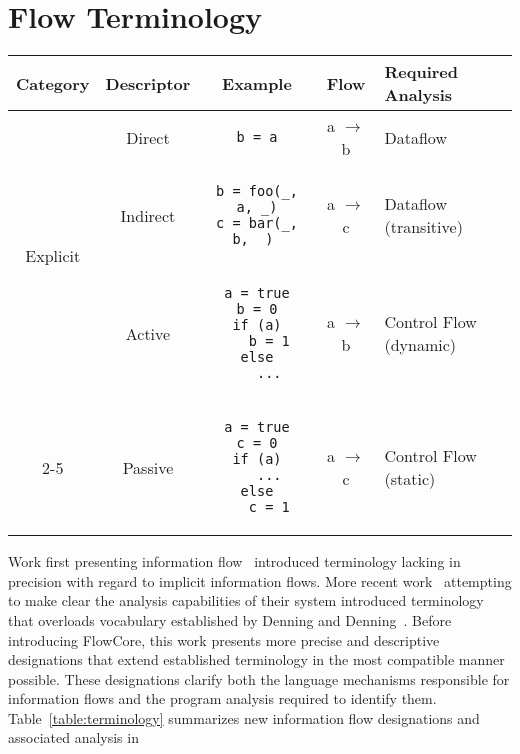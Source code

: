 \chapter{Flow Terminology}

\label{sec:terminology}

\begin{table*}
\centering
\begin{tabular}{ccccm{2.5cm}}
\toprule
Category & Descriptor & Example & Flow & Required Analysis \\
\midrule[\heavyrulewidth]
\multirow{3}{*}{Explicit} & Direct & 
\begin{lstlisting}
b = a
\end{lstlisting} & a $\rightarrow$ b & Dataflow\\
\cmidrule(r){2-5} & Indirect &
\begin{lstlisting}
b = foo(_, a, _)
c = bar(_, b, _) 
\end{lstlisting}
& a $\rightarrow$ c & Dataflow (transitive) \\
\hline
\multirow{7}{*}{Implicit} & Active & 
\begin{lstlisting}
a = true
b = 0
if (a)
   b = 1
else
   ...
\end{lstlisting}
& a $\rightarrow$ b & Control Flow (dynamic)\\
\cmidrule(r){2-5} & Passive & 
\begin{lstlisting}
a = true
c = 0
if (a)
   ...
else
   c = 1
\end{lstlisting}
& a $\rightarrow$ c & Control Flow (static)\\
\bottomrule
\end{tabular}
\caption{Terminology of Information Flows.}
\label{table:terminology}
\end{table*}

Work first presenting information flow~\cite{denning-cert} introduced terminology lacking in precision with regard  to implicit information flows.
More recent work~\cite{empirical-study} attempting to make clear the analysis capabilities of their system introduced terminology that overloads vocabulary established by Denning and Denning~\cite{denning-cert}.
Before introducing FlowCore, this work presents more precise and descriptive designations that extend established terminology in the most compatible manner possible.
These designations clarify both the language mechanisms responsible for information flows and the program analysis required to identify them.
Table~\ref{table:terminology} summarizes new information flow designations and associated analysis in 

